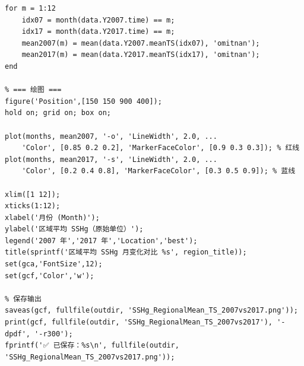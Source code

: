 \documentclass[UTF8]{article}
\begin{document}
\begin{verbatim}
for m = 1:12
    idx07 = month(data.Y2007.time) == m;
    idx17 = month(data.Y2017.time) == m;
    mean2007(m) = mean(data.Y2007.meanTS(idx07), 'omitnan');
    mean2017(m) = mean(data.Y2017.meanTS(idx17), 'omitnan');
end

% === 绘图 ===
figure('Position',[150 150 900 400]);
hold on; grid on; box on;

plot(months, mean2007, '-o', 'LineWidth', 2.0, ...
    'Color', [0.85 0.2 0.2], 'MarkerFaceColor', [0.9 0.3 0.3]); % 红线
plot(months, mean2017, '-s', 'LineWidth', 2.0, ...
    'Color', [0.2 0.4 0.8], 'MarkerFaceColor', [0.3 0.5 0.9]); % 蓝线

xlim([1 12]);
xticks(1:12);
xlabel('月份 (Month)');
ylabel('区域平均 SSHg（原始单位）');
legend('2007 年','2017 年','Location','best');
title(sprintf('区域平均 SSHg 月变化对比 %s', region_title));
set(gca,'FontSize',12);
set(gcf,'Color','w');

% 保存输出
saveas(gcf, fullfile(outdir, 'SSHg_RegionalMean_TS_2007vs2017.png'));
print(gcf, fullfile(outdir, 'SSHg_RegionalMean_TS_2007vs2017'), '-dpdf', '-r300');
fprintf('✅ 已保存：%s\n', fullfile(outdir, 'SSHg_RegionalMean_TS_2007vs2017.png'));

\end{verbatim}   
\end{document}

